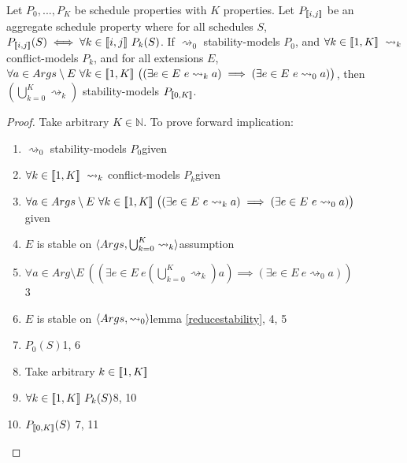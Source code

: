 \begin{theorem}
	\label{modelling}
	Let $P_0,...,P_K$ be schedule properties with $K$ properties. Let $P_{[\![{i,j}]\!]}$ be an aggregate schedule property where for all schedules $S$, $P_{[\![{i, j}]\!]}(S)\iff\forall k\in[\![{i,j}]\!]\ P_k(S)$.
	\linespace
	If $\rightsquigarrow_0$ stability-models $P_0$, and $\forall k\in\intset{1,K}\ \rightsquigarrow_k$ conflict-models $P_k$, and for all extensions $E$, $\forall a\in Args\setminus E\ \forall k\in[\![{1,K}]\!]\ \big((\exists e\in E\ e\rightsquigarrow_k a)\implies(\exists e\in E\ e\rightsquigarrow_0 a)\big)$, then $\left(\bigcup_{k=0}^K\rightsquigarrow_k\right)$ stability-models $P_{[\![{0,K}]\!]}$.
	
	\begin{proof}
		Take arbitrary $K\in\mathbb{N}$. To prove forward implication:
		\begin{enumerate}
			\item$\rightsquigarrow_0$ stability-models $P_0$\hfill given
			\item$\forall k\in\intset{1,K}\ \rightsquigarrow_k$ conflict-models $P_k$\hfill given
			\item$\forall a\in Args\setminus E\ \forall k\in[\![{1,K}]\!]\ \big((\exists e\in E\ e\rightsquigarrow_k a)\implies(\exists e\in E\ e\rightsquigarrow_0 a)\big)$\\\null\hfill given
			\item$E$ is stable on $\langle{Args},{\bigcup_{k=0}^K\rightsquigarrow_k}\rangle$\hfill assumption
			\item$\forall a\in Arg\setminus E\ \left(\left(\exists e\in E\ e\left(\bigcup_{k=0}^K\rightsquigarrow_k\right) a\right)\implies(\exists e\in E\ e\rightsquigarrow_0 a)\right)$\\\null\hfill 3
			\item$E$ is stable on $\langle{Args},{\rightsquigarrow_0}\rangle$\hfill lemma \ref{reducestability}, 4, 5
			\item$P_0(S)$\hfill 1, 6
			\item Take arbitrary $k\in[\![{1,K}]\!]$
			\item$\forall k\in\intset{1,K}\ P_k(S)$\hfill 8, 10
			\item$P_{[\![{0,K}]\!]}(S)$ \hfill 7, 11
		\end{enumerate}
	

\end{proof}
\end{theorem}
